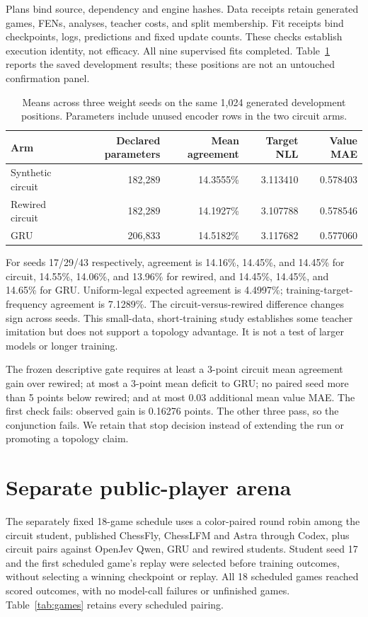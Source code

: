 \documentclass[10pt]{article}
\begin{document}
Plans bind source, dependency and engine hashes. Data receipts retain generated
games, FENs, analyses, teacher costs, and split membership. Fit receipts bind
checkpoints, logs, predictions and fixed update counts. These checks establish
execution identity, not efficacy. All nine supervised fits completed.
Table~\ref{tab:results} reports the saved development results; these positions
are not an untouched confirmation panel.

\begin{table}[t]
\centering
\small
\begin{tabular}{lrrrr}
\toprule
Arm & Declared parameters & Mean agreement & Target NLL & Value MAE\\
\midrule
Synthetic circuit & 182,289 & 14.3555\% & 3.113410 & 0.578403\\
Rewired circuit & 182,289 & 14.1927\% & 3.107788 & 0.578546\\
GRU & 206,833 & 14.5182\% & 3.117682 & 0.577060\\
\bottomrule
\end{tabular}
\caption{Means across three weight seeds on the same 1,024 generated development
positions. Parameters include unused encoder rows in the two circuit arms.}
\label{tab:results}
\end{table}

For seeds 17/29/43 respectively, agreement is
14.16\%, 14.45\%, and 14.45\% for circuit,
14.55\%, 14.06\%, and 13.96\% for rewired, and
14.45\%, 14.45\%, and 14.65\% for GRU. Uniform-legal expected agreement is
4.4997\%; training-target-frequency agreement is 7.1289\%.
The circuit-versus-rewired difference changes sign across seeds. This small-data,
short-training study establishes some teacher imitation but does not support a
topology advantage. It is not a test of larger models or longer training.

The frozen descriptive gate requires at least a 3-point circuit mean agreement
gain over rewired; at most a 3-point mean deficit to GRU; no paired seed more
than 5 points below rewired; and at most 0.03 additional mean value MAE.
The first check fails: observed gain is 0.16276 points. The other three pass,
so the conjunction fails. We retain that stop decision instead of extending
the run or promoting a topology claim.

\section{Separate public-player arena}
The separately fixed 18-game schedule uses a color-paired round robin among
the circuit student, published ChessFly, ChessLFM and Astra through Codex,
plus circuit pairs against OpenJev Qwen, GRU and rewired students.
Student seed 17 and the first scheduled game's replay were selected before
training outcomes, without selecting a winning checkpoint or replay.
All 18 scheduled games reached scored outcomes, with no model-call failures or
unfinished games. Table~\ref{tab:games} retains every scheduled pairing.
\end{document}
